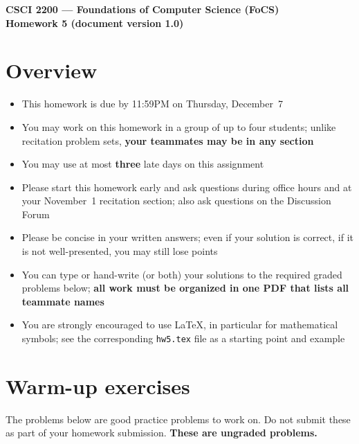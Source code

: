 \documentclass[11pt]{article}
\begin{document}
\thispagestyle{empty}

\begin{center}
\large
\textbf{CSCI 2200 --- Foundations of Computer Science (FoCS) \\
Homework 5 (document version 1.0)}
\end{center}

\section*{Overview}
\begin{itemize}
\item This homework is due by 11:59PM on Thursday, December~7
\item You may work on this homework in a group of up to four students;
  unlike recitation problem sets,
  \textbf{your teammates may be in any section}
\item You may use at most \textbf{three} late days on this assignment
\item Please start this homework early and ask questions during
  office hours and at your November~1 recitation section;
  also ask questions on the Discussion Forum
\item Please be concise in your written answers;
  even if your solution is correct, if it is not well-presented,
  you may still lose points
\item You can type or hand-write (or both) your solutions
  to the required graded problems below;
  \textbf{all work must be organized in one PDF that lists
  all teammate names}
\item You are strongly encouraged to use LaTeX, in particular for
  mathematical symbols;
  see the corresponding \verb+hw5.tex+ file as a starting point
  and example
\end{itemize}

\newpage
\section*{Warm-up exercises}
The problems below are good practice problems to work on.
Do not submit these as part of your homework submission.
\textbf{These are ungraded problems.}
\end{document}
